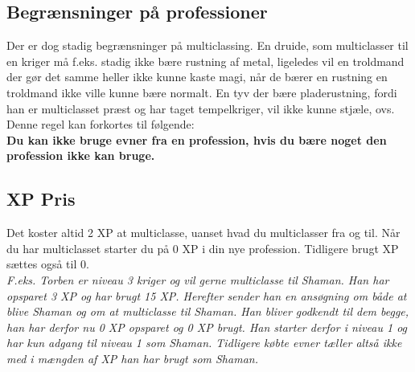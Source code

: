 \subsection*{Begrænsninger på professioner}
Der er dog stadig begrænsninger på multiclassing. En druide, som multiclasser til en kriger må f.eks. stadig ikke bære rustning af metal, ligeledes vil en troldmand der gør det samme heller ikke kunne kaste magi, når de bærer en rustning en troldmand ikke ville kunne bære normalt. En tyv der bære pladerustning, fordi han er multiclasset præst og har taget tempelkriger, vil ikke kunne stjæle, ovs.\\
Denne regel kan forkortes til følgende:\\
\textbf{Du kan ikke bruge evner fra en profession, hvis du bære noget den profession ikke kan bruge.}\\

\subsection*{XP Pris}
Det koster altid 2 XP at multiclasse, uanset hvad du multiclasser fra og til. Når du har multiclasset starter du på 0 XP i din nye profession. Tidligere brugt XP sættes også til 0.\\
\textit{F.eks. Torben er niveau 3 kriger og vil gerne multiclasse til Shaman. Han har opsparet 3 XP og har brugt 15 XP. Herefter sender han en ansøgning om både at blive Shaman og om at multiclasse til Shaman. Han bliver godkendt til dem begge, han har derfor nu 0 XP opsparet og 0 XP brugt. Han starter derfor i niveau 1 og har kun adgang til niveau 1 som Shaman. Tidligere købte evner tæller altså ikke med i mængden af XP han har brugt som Shaman.}
